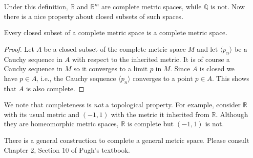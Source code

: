 Under this definition, $\mathbb{R}$ and $\mathbb{R}^m$ are complete metric spaces, while $\mathbb{Q}$ is not.
Now there is a nice property about closed subsets of such spaces.

\begin{thm}
  Every closed subset of a complete metric space is a complete metric space.
\end{thm}

\begin{proof}
  Let $A$ be a closed subset of the complete metric space $M$ and let $\langle p_n \rangle$ be a Cauchy sequence in $A$ with respect to the inherited metric.
  It is of course a Cauchy sequence in $M$ so it converges to a limit $p$ in $M$.
  Since $A$ is closed we have $p \in A$, i.e., the Cauchy sequence $\langle p_n \rangle$ converges to a point $p \in A$.
  This shows that $A$ is also complete.
\end{proof}

We note that completeness is \textit{not} a topological property.
For example, consider $\mathbb{R}$ with its usual metric and $(-1,1)$ with the metric it inherited from $\mathbb{R}$.
Although they are homeomorphic metric spaces, $\mathbb{R}$ is complete but $(-1,1)$ is not.

There is a general construction to complete a general metric space.
Please consult Chapter 2, Section 10 of Pugh's textbook.
